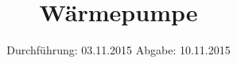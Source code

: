 

\subject{206}
\title{Wärmepumpe}
\date{
  Durchführung: 03.11.2015
  \hspace{3em}
  Abgabe: 10.11.2015
}



\maketitle
\newpage
\thispagestyle{empty}
\tableofcontents
\newpage





\nocite{*}
\printbibliography




